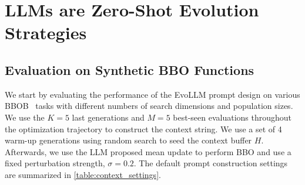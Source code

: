 
\section{LLMs are Zero-Shot Evolution Strategies}

\subsection{Evaluation on Synthetic BBO Functions}

We start by evaluating the performance of the EvoLLM prompt design on various BBOB~\cite{hansen2010real} tasks with different numbers of search dimensions and population sizes. We use the $K=5$ last generations and $M = 5$ best-seen evaluations throughout the optimization trajectory to construct the context string. We use a set of 4 warm-up generations using random search to seed the context buffer $H$. Afterwards, we use the LLM proposed mean update to perform BBO and use a fixed perturbation strength, $\sigma=0.2$. The default prompt construction settings are summarized in \cref{table:context_settings}.

